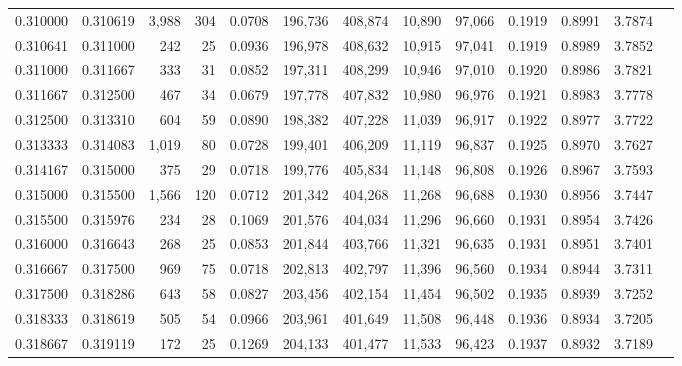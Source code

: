 \begin{tabular}{rrrrrrrrrrrrr}
0.310000 & 0.310619 & 3,988 & 304 &                                     0.0708 & 196,736 & 408,874 &  10,890 &  97,066 & 0.1919 & 0.8991 & 3.7874 \\
0.310641 & 0.311000 &   242 &  25 &                                     0.0936 & 196,978 & 408,632 &  10,915 &  97,041 & 0.1919 & 0.8989 & 3.7852 \\
0.311000 & 0.311667 &   333 &  31 &                                     0.0852 & 197,311 & 408,299 &  10,946 &  97,010 & 0.1920 & 0.8986 & 3.7821 \\
0.311667 & 0.312500 &   467 &  34 &                                     0.0679 & 197,778 & 407,832 &  10,980 &  96,976 & 0.1921 & 0.8983 & 3.7778 \\
0.312500 & 0.313310 &   604 &  59 &                                     0.0890 & 198,382 & 407,228 &  11,039 &  96,917 & 0.1922 & 0.8977 & 3.7722 \\
0.313333 & 0.314083 & 1,019 &  80 &                                     0.0728 & 199,401 & 406,209 &  11,119 &  96,837 & 0.1925 & 0.8970 & 3.7627 \\
0.314167 & 0.315000 &   375 &  29 &                                     0.0718 & 199,776 & 405,834 &  11,148 &  96,808 & 0.1926 & 0.8967 & 3.7593 \\
0.315000 & 0.315500 & 1,566 & 120 &                                     0.0712 & 201,342 & 404,268 &  11,268 &  96,688 & 0.1930 & 0.8956 & 3.7447 \\
0.315500 & 0.315976 &   234 &  28 &                                     0.1069 & 201,576 & 404,034 &  11,296 &  96,660 & 0.1931 & 0.8954 & 3.7426 \\
0.316000 & 0.316643 &   268 &  25 &                                     0.0853 & 201,844 & 403,766 &  11,321 &  96,635 & 0.1931 & 0.8951 & 3.7401 \\
0.316667 & 0.317500 &   969 &  75 &                                     0.0718 & 202,813 & 402,797 &  11,396 &  96,560 & 0.1934 & 0.8944 & 3.7311 \\
0.317500 & 0.318286 &   643 &  58 &                                     0.0827 & 203,456 & 402,154 &  11,454 &  96,502 & 0.1935 & 0.8939 & 3.7252 \\
0.318333 & 0.318619 &   505 &  54 &                                     0.0966 & 203,961 & 401,649 &  11,508 &  96,448 & 0.1936 & 0.8934 & 3.7205 \\
0.318667 & 0.319119 &   172 &  25 &                                     0.1269 & 204,133 & 401,477 &  11,533 &  96,423 & 0.1937 & 0.8932 & 3.7189 \\

\end{tabular}
